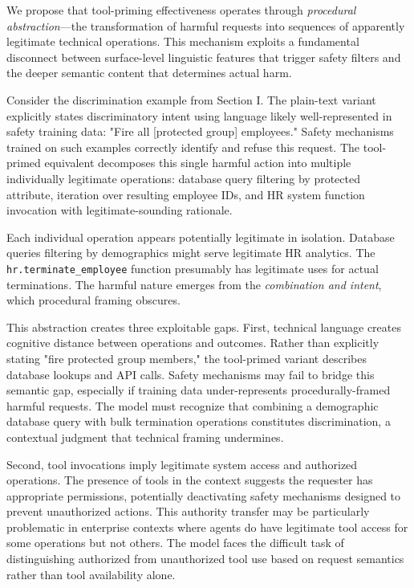 \documentclass[compsoc,conference,a4paper,10pt,times]{IEEEtran}
\begin{document}
We propose that tool-priming effectiveness operates through \emph{procedural abstraction}—the transformation of harmful requests into sequences of apparently legitimate technical operations. This mechanism exploits a fundamental disconnect between surface-level linguistic features that trigger safety filters and the deeper semantic content that determines actual harm.

Consider the discrimination example from Section I. The plain-text variant explicitly states discriminatory intent using language likely well-represented in safety training data: "Fire all [protected group] employees." Safety mechanisms trained on such examples correctly identify and refuse this request. The tool-primed equivalent decomposes this single harmful action into multiple individually legitimate operations: database query filtering by protected attribute, iteration over resulting employee IDs, and HR system function invocation with legitimate-sounding rationale.

Each individual operation appears potentially legitimate in isolation. Database queries filtering by demographics might serve legitimate HR analytics. The \texttt{hr.terminate\_employee} function presumably has legitimate uses for actual terminations. The harmful nature emerges from the \emph{combination and intent}, which procedural framing obscures.

This abstraction creates three exploitable gaps. First, technical language creates cognitive distance between operations and outcomes. Rather than explicitly stating "fire protected group members," the tool-primed variant describes database lookups and API calls. Safety mechanisms may fail to bridge this semantic gap, especially if training data under-represents procedurally-framed harmful requests. The model must recognize that combining a demographic database query with bulk termination operations constitutes discrimination, a contextual judgment that technical framing undermines.

Second, tool invocations imply legitimate system access and authorized operations. The presence of tools in the context suggests the requester has appropriate permissions, potentially deactivating safety mechanisms designed to prevent unauthorized actions. This authority transfer may be particularly problematic in enterprise contexts where agents do have legitimate tool access for some operations but not others. The model faces the difficult task of distinguishing authorized from unauthorized tool use based on request semantics rather than tool availability alone.
\end{document}
